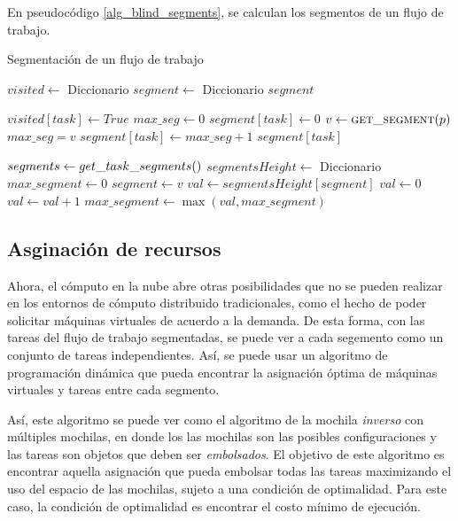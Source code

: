 En pseudocódigo \ref{alg_blind_segments}, se calculan los segmentos de un flujo de trabajo.

\begin{algorithm}
\caption{Segmentación de un flujo de trabajo}
\label{alg_blind_segments}
\begin{algorithmic}[1]
	\State $visited \gets$ Diccionario
	\State $segment \gets$ Diccionario
		\State {}
	\EndFor
	\State \Return $segment$
\EndProcedure

	\State $visited[task] \gets True$
	\State $max\_seg \gets 0$
		\State $segment[task] \gets 0$
			\State $v \gets \Call{get\_segment}{p}$
				\State $max\_seg = v$
			\EndIf
		\EndFor
		\State $segment[task] \gets max\_seg + 1$
	\EndIf
	\State \Return $segment[task]$
\EndProcedure


	\State $segments \gets \Call{$get\_task\_segments$}$
	\State $segmentsHeight \gets $ Diccionario
	\State $max\_segment \gets 0$
		\State $segment \gets v$
			\State $val \gets segmentsHeight[ segment ]$
		\Else
			\State $val \gets 0$
		\EndIf
		\State $val \gets val + 1$
		\State $max\_segment \gets \max(val, max\_segment)$
	\EndFor
\EndProcedure
	
\end{algorithmic}
\end{algorithm}

\subsection{Asginación de recursos}

Ahora, el cómputo en la nube abre otras posibilidades que no se pueden realizar en los entornos de cómputo distribuido tradicionales, como el hecho de poder solicitar máquinas virtuales de acuerdo a la demanda. De esta forma, con las tareas del flujo de trabajo segmentadas, se puede ver a cada segemento como un conjunto de tareas independientes. Así, se puede usar un algoritmo de programación dinámica que pueda encontrar la asignación óptima de máquinas virtuales y tareas entre cada segmento.

Así, este algoritmo se puede ver como el algoritmo de la mochila \emph{inverso} con múltiples mochilas, en donde los las mochilas son las posibles configuraciones y las tareas son objetos que deben ser \emph{embolsados}. El objetivo de este algoritmo es encontrar aquella asignación que pueda embolsar todas las tareas maximizando el uso del espacio de las mochilas, sujeto a una condición de optimalidad. Para este caso, la condición de optimalidad es encontrar el costo mínimo de ejecución.

